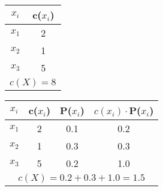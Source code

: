 \documentclass[cjk,t,compress,12pt]{standalone}
\begin{document}
\begin{CJK}{UTF8}{you}




\begin{tabular}{c|c}
	\multicolumn{1}{c|}{$x_i$} & c($x_i$) \\ \hline
	\multicolumn{1}{c|}{$x_1$} & 2        \\
	\multicolumn{1}{c|}{$x_2$} & 1        \\
	\multicolumn{1}{c|}{$x_3$} & 5        \\ \hline
	\multicolumn{2}{c}{$c(X)=8$}         
\end{tabular}


 \begin{tabular}{cccc}
\multicolumn{1}{c|}{$x_i$} & c($x_i$) & P($x_i$) & $c(x_i)\cdot$P($x_i$) \\ \hline
\multicolumn{1}{c|}{$x_1$} & 2        & 0.1      & 0.2                   \\
\multicolumn{1}{c|}{$x_2$} & 1        & 0.3      & 0.3                   \\
\multicolumn{1}{c|}{$x_3$} & 5        & 0.2      & 1.0                   \\ \hline
\multicolumn{4}{c}{$c(X)=0.2+0.3+1.0=1.5$}                                
\end{tabular}
 


\end{CJK}
\end{document}
